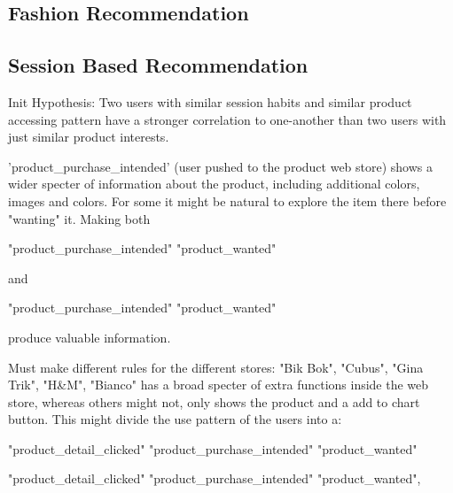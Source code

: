 




\subsection{Fashion Recommendation}



\subsection{Session Based Recommendation}
Init Hypothesis:
Two users with similar session habits and similar product accessing pattern have a stronger correlation to one-another than two users with just similar product interests.


'product\_purchase\_intended' (user pushed to the product web store) shows a wider specter of information about the product, including additional colors, images and colors.
For some it might be natural to explore the item there before "wanting" it. Making both

"product\_purchase\_intended"
 \Rightarrow
"product\_wanted"

and

"product\_purchase\_intended"
\notimplies
"product\_wanted"

produce valuable information.

Must make different rules for the different stores:
"Bik Bok", "Cubus", "Gina Trik", "H\&M", "Bianco" has a broad specter of extra functions inside the web store, whereas others might not, only shows the product and a add to chart button.
This might divide the use pattern of the users into a:

"product\_detail\_clicked" \Rightarrow "product\_purchase\_intended" \Rightarrow "product\_wanted"

"product\_detail\_clicked" \Rightarrow "product\_purchase\_intended"
\notimplies
"product\_wanted",

